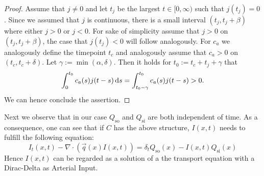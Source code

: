 \documentclass[paper=a4, fontsize=12pt,parskip=half,draft,headings=small]{scrartcl}
\newcommand{\Qso}{Q_{\mathrm{so}}}
\newcommand{\Qsi}{Q_{\mathrm{si}}}
\newcommand{\q}{\vec{q}}
\begin{document}
		\begin{proof}
			Assume that $j \neq 0$ and let $t_j$ be the largest $t \in [0,\infty)$ such that $j(t_j)=0$.
			Since we assumed that $j$ is continuous, there is a small interval $(t_j,t_j+\beta)$ where either $j>0$ or $j<0$.
			For sake of simplicity assume that $j>0$ on $(t_j,t_j+\beta)$, the case that $j(t_j)<0$ will follow analogously.
			For $c_a$ we analogously define the timepoint $t_c$ and analogously assume that $c_a>0$ on $(t_c, t_c + \delta)$.
			Let $\gamma:=\min(\alpha,\delta)$.
			Then it holds for $t_0 := t_c + t_j + \gamma$ that
			\[
				\int_0^{t_0} c_a(s) j(t-s) \mathop{}\!\mathrm{d} s = \int_{t_0-\gamma}^{t_0} c_a(s)j(t-s) > 0.
			\]
			We can hence conclude the assertion.
		\end{proof}
		
		Next we observe that in our case $\Qso$ and $\Qsi$ are both independent of time.
		As a consequence, one can see that if $C$ has the above structure, $I(x,t)$ needs to fulfill the following equation:
		\[
			I_t(x,t) - \nabla \cdot (\q(x)I(x,t)) = \delta_t\Qso(x) - I(x,t)\Qsi(x)
		\]
		Hence $I(x,t)$ can be regarded as a solution of a the transport equation with a Dirac-Delta as Arterial Input.
		
		
		
		
		
		
		
		
		
\end{document}
